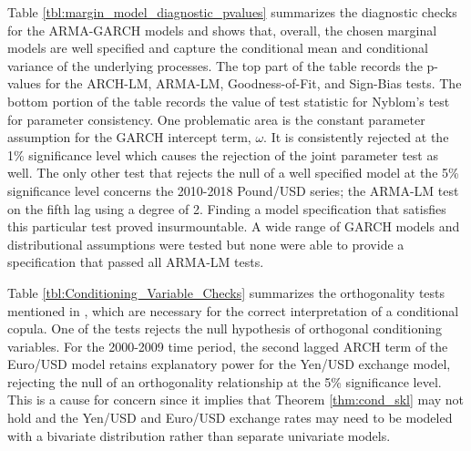 Table \ref{tbl:margin_model_diagnostic_pvalues} summarizes the diagnostic checks for the ARMA-GARCH models and shows that, overall, the chosen marginal models are well specified and capture the conditional mean and conditional variance of the underlying processes. The top part of the table records the p-values for the ARCH-LM, ARMA-LM, Goodness-of-Fit, and Sign-Bias tests. The bottom portion of the table records the value of test statistic for Nyblom's test for parameter consistency. One problematic area is the constant parameter assumption for the GARCH intercept term, $\omega$. It is consistently rejected at the 1\% significance level which causes the rejection of the joint parameter test as well. The only other test that rejects the null of a well specified model at the 5\% significance level concerns the 2010-2018 Pound/USD series; the ARMA-LM test on the fifth lag using a degree of 2. Finding a model specification that satisfies this particular test proved insurmountable. A wide range of GARCH models and distributional assumptions were tested but none were able to provide a specification that passed all ARMA-LM tests.

Table \ref{tbl:Conditioning_Variable_Checks} summarizes the orthogonality tests mentioned in \cite{Patton_2006}, which are necessary for the correct interpretation of a conditional copula. One of the tests rejects the null hypothesis of orthogonal conditioning variables. For the 2000-2009 time period, the second lagged ARCH term of the Euro/USD model retains explanatory power for the Yen/USD exchange model, rejecting the null of an orthogonality relationship at the 5\% significance level. This is a cause for concern since it implies that Theorem \ref{thm:cond_skl} may not hold and the Yen/USD and Euro/USD exchange rates may need to be modeled with a bivariate distribution rather than separate univariate models.


